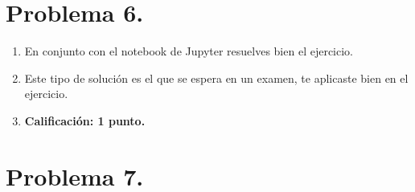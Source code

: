 \section{Problema 6.}

\begin{enumerate}
\item En conjunto con el notebook de Jupyter resuelves bien el ejercicio.
\item Este tipo de solución es el que se espera en un examen, te aplicaste bien en el ejercicio.
\item \textbf{Calificación: 1 punto.}
\end{enumerate}

\section{Problema 7.}

